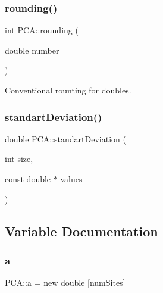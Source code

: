 \hypertarget{namespace_p_c_a_acd05fa0d440ac1781a76499f3cdb3f38}{}\label{namespace_p_c_a_acd05fa0d440ac1781a76499f3cdb3f38} 
\subsubsection{\texorpdfstring{rounding()}{rounding()}}
{\footnotesize\ttfamily int P\+C\+A\+::rounding (\begin{DoxyParamCaption}\item[{double}]{number }\end{DoxyParamCaption})}



Conventional rounting for doubles. 

\hypertarget{namespace_p_c_a_ae9120f4f9875a87768cc3090196892a8}{}\label{namespace_p_c_a_ae9120f4f9875a87768cc3090196892a8} 
\subsubsection{\texorpdfstring{standart\+Deviation()}{standartDeviation()}}
{\footnotesize\ttfamily double P\+C\+A\+::standart\+Deviation (\begin{DoxyParamCaption}\item[{int}]{size,  }\item[{const double $\ast$}]{values }\end{DoxyParamCaption})}



\subsection{Variable Documentation}
\hypertarget{namespace_p_c_a_a7ba252167ecbbceaa608cd406810aa1f}{}\label{namespace_p_c_a_a7ba252167ecbbceaa608cd406810aa1f} 
\subsubsection{\texorpdfstring{a}{a}}
{\footnotesize\ttfamily P\+C\+A\+::a = new double \mbox{[}num\+Sites\mbox{]}}

\hypertarget{namespace_p_c_a_a92ab50a62efb8eaa1bcd8e279828125b}{}\label{namespace_p_c_a_a92ab50a62efb8eaa1bcd8e279828125b} 
